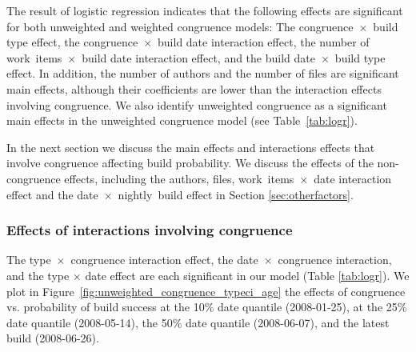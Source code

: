 The result of logistic regression indicates that the following effects are significant for both unweighted and weighted congruence models: The congruence~$\times$~build type effect, the congruence~$\times$~build date interaction effect, the number of work~items~$\times$~build date interaction effect, and the build date~$\times$~build type effect. In addition, the number of authors and the number of files are significant main effects, although their coefficients are lower than the interaction effects involving congruence. We also identify unweighted congruence as a significant main effects in the unweighted congruence model (see Table~\ref{tab:logr}).

In the next section we discuss the main effects and interactions effects that involve congruence affecting build probability. We discuss the effects of the non-congruence effects, including the authors, files, work~items~$\times$~date interaction effect and the date~$\times$~nightly~build effect in Section \ref{sec:otherfactors}.

\subsubsection{Effects of interactions involving congruence}
\label{sec:congruenceinteractions}
The type~$\times$~congruence interaction effect, the date~$\times$~congruence interaction, and the type $\times$ date effect are each significant in our model (Table \ref{tab:logr}). We plot in Figure~\ref{fig:unweighted_congruence_typeci_age} the effects of congruence vs. probability of build success at the 10\% date quantile (2008-01-25), at the 25\% date quantile (2008-05-14), the 50\% date quantile (2008-06-07), and the latest build (2008-06-26).



